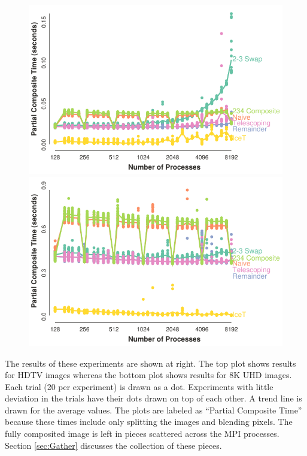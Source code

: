 \documentclass{vgtc}                          %
\newcommand*{\textalgorithm}[1]{\textsf{#1}\xspace}
\newcommand{\binaryswap}{\textalgorithm{binary swap}}
\begin{document}
\begin{figure}
  \includegraphics[width=\linewidth]{scaling-hdtv}
  \includegraphics[width=\linewidth]{scaling-8k}
\end{figure}
The results of these experiments are shown at right.
The top plot shows results for HDTV images whereas the bottom plot shows results for 8K UHD images.
Each trial (20 per experiment) is drawn as a dot.
Experiments with little deviation in the trials have their dots drawn on top of each other.
A trend line is drawn for the average values.
The plots are labeled as ``Partial Composite Time'' because these times include only splitting the images and blending pixels.
The fully composited image is left in pieces scattered across the MPI processes.
Section \ref{sec:Gather} discusses the collection of these pieces.
\end{document}
